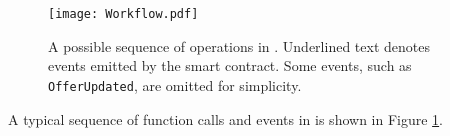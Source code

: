 





\begin{figure}[t]
    \centering
    \texttt{[image: Workflow.pdf]}
    \caption{A possible sequence of operations in \Platform. Underlined text denotes events emitted by the smart contract. Some events, such as \texttt{OfferUpdated}, are omitted for simplicity. %
    }
    \vspace{-0.1in}
    \label{fig:workflow}
\end{figure}

 A typical sequence of function calls and events in \Platform is shown in Figure \ref{fig:workflow}.
